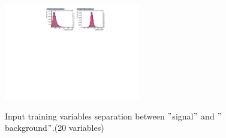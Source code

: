 			\FloatBarrier
			\begin{figure}[H]
			\centering{}
    			\includegraphics[width=0.528\textwidth]{Figures/EventSelReco/mva/a05_VarSep4.pdf}\\
    		\caption{Input training variables separation between $"$signal$"$ and $"$background$"$.(20 variables)}
			\label{EventSelReco:fig:a05_varsep}
			\end{figure}
			\FloatBarrier


